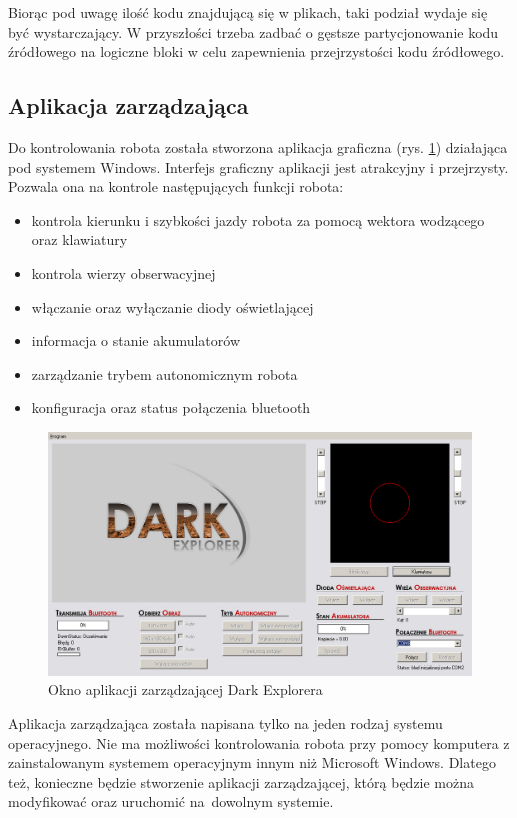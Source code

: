 Biorąc pod uwagę ilość kodu znajdującą się w plikach, taki podział wydaje się być
wystarczający. W przyszłości trzeba zadbać o gęstsze partycjonowanie kodu
źródłowego na logiczne bloki w celu zapewnienia przejrzystości kodu źródłowego.

\subsection{Aplikacja zarządzająca}
Do kontrolowania robota została stworzona aplikacja graficzna (rys.
\ref{fig:AplikacjaZarz}) działająca pod systemem Windows. Interfejs graficzny
aplikacji jest atrakcyjny i przejrzysty. Pozwala ona na kontrole następujących funkcji robota:
\begin{itemize}
\setlength{\parsep}{2pt}
\setlength{\itemsep}{2mm}
\setlength{\parskip}{4pt}
 \item kontrola kierunku i szybkości jazdy robota za pomocą wektora wodzącego oraz klawiatury
 \item kontrola wierzy obserwacyjnej
 \item włączanie oraz wyłączanie diody oświetlającej
 \item informacja o stanie akumulatorów
 \item zarządzanie trybem autonomicznym robota
 \item konfiguracja oraz status połączenia bluetooth
\end{itemize}

\begin{figure}[!ht]
 \centering
 \includegraphics[width=\textwidth]{../images/ch02/decontrollprogram.png}
 \caption{Okno aplikacji zarządzającej Dark Explorera}
 \label{fig:AplikacjaZarz}
\end{figure}

Aplikacja zarządzająca została napisana tylko na jeden rodzaj systemu
operacyjnego. Nie ma możliwości kontrolowania robota przy pomocy komputera z
zainstalowanym systemem operacyjnym innym niż Microsoft Windows. Dlatego też,
konieczne będzie stworzenie aplikacji zarządzającej, którą będzie można
modyfikować oraz uruchomić na~dowolnym systemie.

